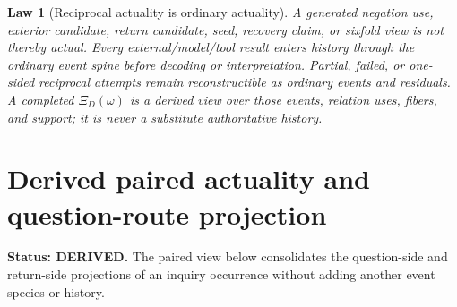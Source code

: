 \documentclass[11pt,oneside]{article}
\newtheorem{law}[definition]{Law}
\begin{document}
\begin{law}[Reciprocal actuality is ordinary actuality]\label{law:reciprocal-actuality}
A generated negation use, exterior candidate, return candidate, seed, recovery claim, or sixfold view is not thereby actual.  Every external/model/tool result enters history through the ordinary event spine before decoding or interpretation.  Partial, failed, or one-sided reciprocal attempts remain reconstructible as ordinary events and residuals.  A completed \(\Xi_D(\omega)\) is a derived view over those events, relation uses, fibers, and support; it is never a substitute authoritative history.
\end{law}

\section{Derived paired actuality and question-route projection}

\textbf{Status: DERIVED.}  The paired view below consolidates the question-side and return-side
projections of an inquiry occurrence without adding another event species or history.
\end{document}
